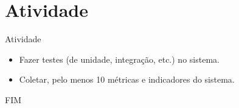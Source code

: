 \documentclass{beamer}
\begin{document}
\section{Atividade}

\begin{frame}{Atividade}
    \begin{itemize}
        \justifying
        \item Fazer testes (de unidade, integração, etc.) no sistema.
        \item Coletar, pelo menos 10 métricas e indicadores do sistema.
    \end{itemize}
\end{frame}



\begin{frame}
    \centering
    \Large
    FIM
\end{frame}
    
\end{document}
